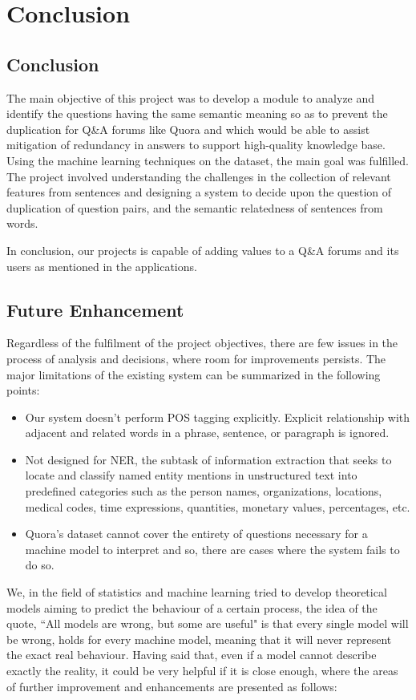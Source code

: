 \chapter{Conclusion}
\section{Conclusion}
The main objective of this project was to develop a module to analyze and identify the questions having the same semantic meaning so as to prevent the duplication for Q\&A forums like Quora and which would be able to assist mitigation of redundancy in answers to support high-quality knowledge base. Using the machine learning techniques on the dataset, the main goal was fulfilled. The project involved understanding the challenges in the collection of relevant features from sentences and designing a system to decide upon the question of duplication of question pairs, and the semantic relatedness of sentences from words.

In conclusion, our projects is capable of adding values to a Q\&A forums and its users as mentioned in the applications.

\section{Future Enhancement}
Regardless of the fulfilment of the project objectives, there are few issues in the process of analysis and decisions, where room for improvements persists. The major limitations of the existing system can be summarized in the following points:

\begin{itemize}
	\item Our system doesn't perform \ac{POS} tagging explicitly. Explicit relationship with adjacent and related words in a phrase, sentence, or paragraph is ignored.
	\item Not designed for \ac{NER}, the subtask of information extraction that seeks to locate and classify named entity mentions in unstructured text into predefined categories such as the person names, organizations, locations, medical codes, time expressions, quantities, monetary values, percentages, etc.
	\item Quora's dataset cannot cover the entirety of questions necessary for a machine model to interpret and so, there are cases where the system fails to do so.
\end{itemize}

We, in the field of statistics and machine learning tried to develop theoretical models aiming to predict the behaviour of a certain process, the idea of the quote, ``All models are wrong, but some are useful" is that every single model will be wrong, holds for every machine model, meaning that it will never represent the exact real behaviour. Having said that, even if a model cannot describe exactly the reality, it could be very helpful if it is close enough, where the areas of further improvement and enhancements are presented as follows:

